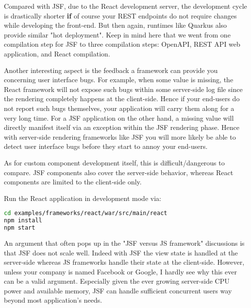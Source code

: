 Compared with JSF, due to the React development server, the development cycle is drastically shorter \textbf{if} of course your REST endpoints do not require changes while developing the front-end.
But then again, runtimes like Quarkus also provide similar "hot deployment".
Keep in mind here that we went from one compilation step for JSF to three compilation steps: OpenAPI, REST API web application, and React compilation.

Another interesting aspect is the feedback a framework can provide you concerning user interface bugs.
For example, when some value is missing, the React framework will not expose such bugs within some server-side log file since the rendering completely happens at the client-side.
Hence if your end-users do not report such bugs themselves, your application will carry them along for a very long time.
For a JSF application on the other hand, a missing value will directly manifest itself via an exception within the JSF rendering phase.
Hence with server-side rendering frameworks like JSF you will more likely be able to detect user interface bugs before they start to annoy your end-users.

As for custom component development itself, this is difficult/dangerous to compare.
JSF components also cover the server-side behavior, whereas React components are limited to the client-side only.

Run the React application in development mode via:
\begin{lstlisting}[language=bash]
cd examples/frameworks/react/war/src/main/react
npm install
npm start
\end{lstlisting}

An argument that often pops up in the "JSF versus JS framework" discussions is that JSF does not scale well.
Indeed with JSF the view state is handled at the server-side whereas JS frameworks handle their state at the client-side.
However, unless your company is named Facebook or Google, I hardly see why this ever can be a valid argument.
Especially given the ever growing server-side CPU power and available memory, JSF can handle sufficient concurrent users way beyond most application's needs.

